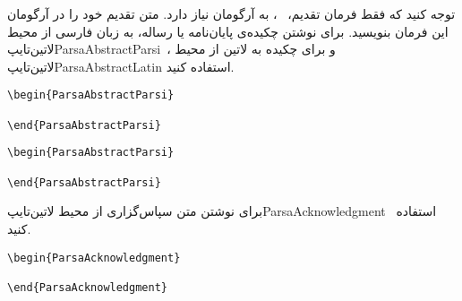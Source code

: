 \documentclass[%
12pt,%
twoside, %
openany, %
notitlepage,%
fleqn,%
]{article}
\numberwithin{equation}{section} %
\begin{document}
توجه کنید که فقط فرمان تقدیم، \textrm{}~، به آرگومان نیاز دارد\@. متن تقدیم خود را در آرگومان این فرمان بنویسید\@. 
برای نوشتن چکیده‌ی پایان‌نامه یا رساله، به زبان فارسی از محیط ‌لاتین{‌تایپ{ParsaAbstractParsi}}~، و برای چکیده به لاتین از محیط ‌لاتین{‌تایپ{ParsaAbstractLatin}} استفاده کنید\@. 
\begin{latin}
\begin{minipage}{0.48\textwidth}
\begin{verbatim}
\begin{ParsaAbstractParsi}

\end{ParsaAbstractParsi}
\end{verbatim}
\end{minipage}
\begin{minipage}{0.48\textwidth}
\begin{verbatim}
\begin{ParsaAbstractParsi}

\end{ParsaAbstractParsi}
\end{verbatim}
\end{minipage}
\end{latin}
\vspace{10mm}
برای نوشتن متن سپاس‌گزاری از محیط ‌لاتین{‌تایپ{ParsaAcknowledgment}} ~استفاده کنید.\\
\begin{latin} \begin{verbatim}
\begin{ParsaAcknowledgment}

\end{ParsaAcknowledgment}
\end{verbatim} \end{latin}
\end{document}
